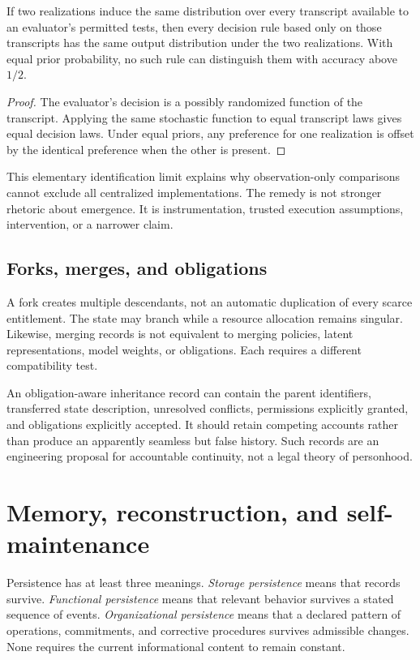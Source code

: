 \begin{MSproposition}\label{MS:prop:identifiability}
If two realizations induce the same distribution over every transcript available to an evaluator's permitted tests, then every decision rule based only on those transcripts has the same output distribution under the two realizations. With equal prior probability, no such rule can distinguish them with accuracy above $1/2$.
\end{MSproposition}
\begin{proof}
The evaluator's decision is a possibly randomized function of the transcript. Applying the same stochastic function to equal transcript laws gives equal decision laws. Under equal priors, any preference for one realization is offset by the identical preference when the other is present.
\end{proof}

This elementary identification limit explains why observation-only comparisons cannot exclude all centralized implementations. The remedy is not stronger rhetoric about emergence. It is instrumentation, trusted execution assumptions, intervention, or a narrower claim.

\subsection{Forks, merges, and obligations}
A fork creates multiple descendants, not an automatic duplication of every scarce entitlement. The state may branch while a resource allocation remains singular. Likewise, merging records is not equivalent to merging policies, latent representations, model weights, or obligations. Each requires a different compatibility test.

An obligation-aware inheritance record can contain the parent identifiers, transferred state description, unresolved conflicts, permissions explicitly granted, and obligations explicitly accepted. It should retain competing accounts rather than produce an apparently seamless but false history. Such records are an engineering proposal for accountable continuity, not a legal theory of personhood.

\section{Memory, reconstruction, and self-maintenance}\label{MS:sec:memory}
Persistence has at least three meanings. \emph{Storage persistence} means that records survive. \emph{Functional persistence} means that relevant behavior survives a stated sequence of events. \emph{Organizational persistence} means that a declared pattern of operations, commitments, and corrective procedures survives admissible changes. None requires the current informational content to remain constant.

